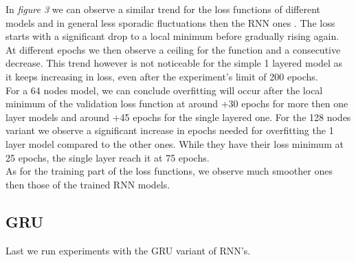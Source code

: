\documentclass[11pt]
{article}
\begin{document}
In \textit{figure 3} we can observe a similar trend for the loss functions of different models and in general less sporadic fluctuations then the RNN ones . The loss starts with a significant drop to a local minimum before gradually rising again. At different epochs we then observe a ceiling for the function and a consecutive decrease. This trend however is not noticeable for the simple 1 layered model as it keeps increasing in loss, even after the experiment's limit of  200 epochs.
\\
For a 64 nodes model, we can conclude overfitting will occur after the local minimum of the validation loss function at around +30 epochs for more then one layer models and around +45  epochs for the single layered one. For the 128 nodes variant we observe a significant increase in epochs needed for overfitting the 1 layer model compared to the other ones. While they have their loss minimum at 25 epochs, the single layer reach it at 75 epochs.
\\
As for the training part of the loss functions, we observe much smoother ones then those of the trained RNN models.

\subsection{GRU}
Last we run experiments with the GRU variant of RNN's. 
\end{document}
